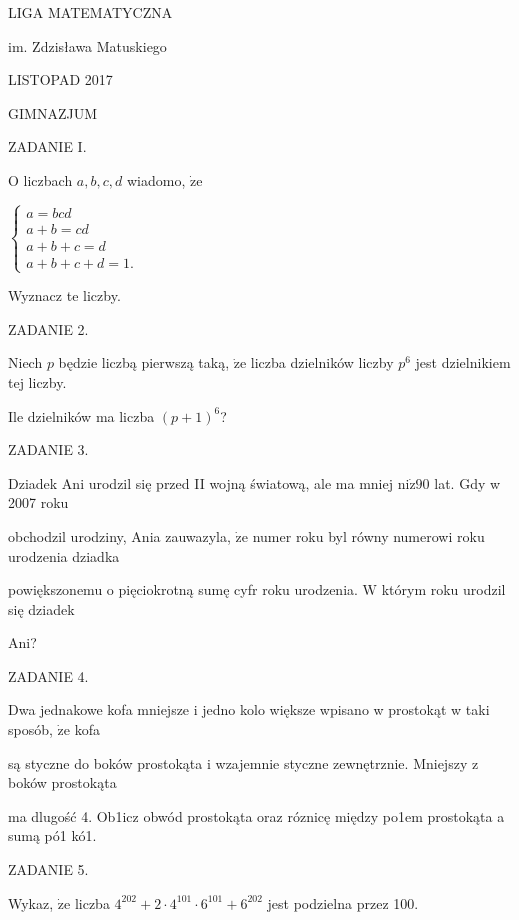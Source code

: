\documentclass[a4paper,12pt]{article}
\begin{document}
LIGA MATEMATYCZNA

im. Zdzisława Matuskiego

LISTOPAD 2017

GIMNAZJUM

ZADANIE I.

$\mathrm{O}$ liczbach $a, b, c, d$ wiadomo, $\dot{\mathrm{z}}\mathrm{e}$

$\left\{\begin{array}{l}
a=bcd\\
a+b=cd\\
a+b+c=d\\
a+b+c+d=1.
\end{array}\right.$

Wyznacz te liczby.

ZADANIE 2.

Niech $p$ będzie liczbą pierwszą taką, $\dot{\mathrm{z}}\mathrm{e}$ liczba dzielników liczby $p^{6}$ jest dzielnikiem tej liczby.

Ile dzielników ma liczba $(p+1)^{6}$?

ZADANIE 3.

Dziadek Ani urodzil się przed II wojną światową, ale ma mniej $\mathrm{n}\mathrm{i}\dot{\mathrm{z}}90$ lat. Gdy w 2007 roku

obchodzil urodziny, Ania zauwazyla, $\dot{\mathrm{z}}\mathrm{e}$ numer roku byl równy numerowi roku urodzenia dziadka

powiększonemu o pięciokrotną sumę cyfr roku urodzenia. $\mathrm{W}$ którym roku urodzil się dziadek

Ani?

ZADANIE 4.

Dwa jednakowe kofa mniejsze i jedno kolo większe wpisano w prostokąt w taki sposób, $\dot{\mathrm{z}}\mathrm{e}$ kofa

są styczne do boków prostokąta i wzajemnie styczne zewnętrznie. Mniejszy z boków prostokąta

ma dlugość 4. Ob1icz obwód prostokąta oraz róznicę między po1em prostokąta a sumą pó1 kó1.

ZADANIE 5.

Wykaz, $\dot{\mathrm{z}}\mathrm{e}$ liczba $4^{202}+2\cdot 4^{101}\cdot 6^{101}+6^{202}$ jest podzielna przez 100.
\end{document}
